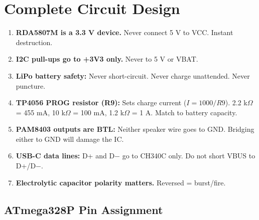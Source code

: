\documentclass[a4paper,11pt]{article}
\renewcommand*{\,}{ }%
\begin{document}
\section{Complete Circuit Design}
\label{sec:circuit}

\begin{dangerbox}
\begin{enumerate}[noitemsep]
    \item \textbf{RDA5807M is a 3.3\,V device.} Never connect 5\,V to VCC. Instant destruction.
    \item \textbf{I2C pull-ups go to +3V3 only.} Never to 5\,V or VBAT.
    \item \textbf{LiPo battery safety:} Never short-circuit. Never charge unattended. Never puncture.
    \item \textbf{TP4056 PROG resistor (R9):} Sets charge current ($I = 1000/R9$). 2.2\,k$\Omega$ = 455\,mA, 10\,k$\Omega$ = 100\,mA, 1.2\,k$\Omega$ = 1\,A. Match to battery capacity.
    \item \textbf{PAM8403 outputs are BTL:} Neither speaker wire goes to GND. Bridging either to GND will damage the IC.
    \item \textbf{USB-C data lines:} D+ and D$-$ go to CH340C only. Do not short VBUS to D+/D$-$.
    \item \textbf{Electrolytic capacitor polarity matters.} Reversed = burst/fire.
\end{enumerate}
\end{dangerbox}

\subsection{ATmega328P Pin Assignment}
\end{document}
